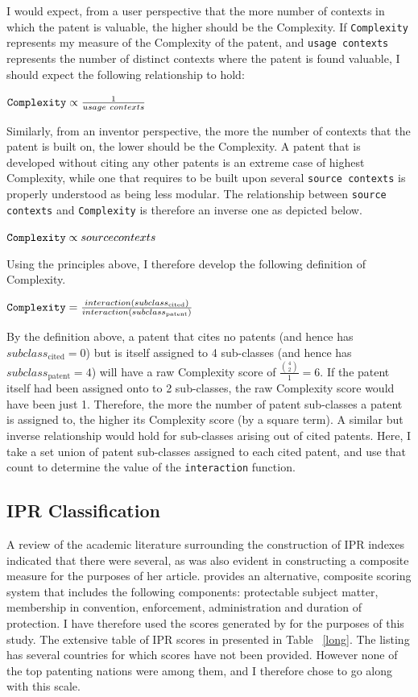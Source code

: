 \documentclass[12pt]{article}
\begin{document}
I would expect, from a user perspective that the more number of contexts in which the patent is valuable, the higher should be the Complexity. If \verb|Complexity| represents my measure of the Complexity of the patent, and \verb|usage contexts| represents the number of distinct contexts where the patent is found valuable, I should expect the following relationship to hold:
\begin{center}$ \verb|Complexity| \propto \frac{1}{usage \ contexts} $ \end{center}
Similarly, from an inventor perspective, the more the number of contexts that the patent is built on, the lower should be the Complexity. A patent that is developed without citing any other patents is an extreme case of highest Complexity, while one that requires to be built upon several \verb|source contexts| is properly understood as being less modular. The relationship between \verb|source contexts| and \verb|Complexity| is therefore an inverse one as depicted below.
\begin{center}$ \verb|Complexity| \propto source contexts $ \end{center} 

Using the principles above, I therefore develop the following definition of Complexity.
\begin{center}$ \verb|Complexity| = \frac{interaction(subclass_{\text{cited}})}{interaction(subclass_{\text{patent}})} $ \end{center}

By the definition above, a patent that cites no patents (and hence has $subclass_{\text{cited}} = 0$) but is itself assigned to 4 sub-classes (and hence has $subclass_{\text{patent}} = 4$) will have a raw Complexity score of $\frac{\binom{4}{2}}{1} = 6$. If the patent itself had been assigned onto to 2 sub-classes, the raw Complexity score would have been just 1. Therefore, the more the number of patent sub-classes a patent is assigned to, the higher its Complexity score (by a square term). A similar but inverse relationship would hold for sub-classes arising out of cited patents. Here, I take a set union of patent sub-classes assigned to each cited patent, and use that count to determine the value of the \verb|interaction| function.

\subsection{IPR Classification}
A review of the academic literature surrounding the construction of IPR indexes indicated that there were several, as was also evident in \cite{Zhao2006} constructing a composite measure for the purposes of her article. \cite{Lesser2010} provides an alternative, composite scoring system that includes the following components: protectable subject matter, membership in convention, enforcement, administration and duration of protection. I have therefore used the scores generated by \cite{Lesser2010} for the purposes of this study. The extensive table of IPR scores in presented in Table ~\ref{long}. The listing has several countries for which scores have not been provided. However none of the top patenting nations were among them, and I therefore chose to go along with this scale.
\end{document}
